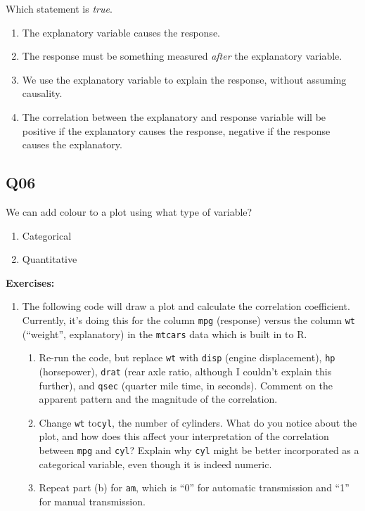 \documentclass[
  letterpaper,
  DIV=11,
  numbers=noendperiod]{scrreprt}
\providecommand{\tightlist}{%
  \setlength{\itemsep}{0pt}\setlength{\parskip}{0pt}}\usepackage{longtable,booktabs,array}
\begin{document}
Which statement is \emph{true}.

\begin{enumerate}
\def\labelenumi{\arabic{enumi}.}
\tightlist
\item
  The explanatory variable causes the response.
\item
  The response must be something measured \emph{after} the explanatory
  variable.
\item
  We use the explanatory variable to explain the response, without
  assuming causality.
\item
  The correlation between the explanatory and response variable will be
  positive if the explanatory causes the response, negative if the
  response causes the explanatory.
\end{enumerate}

\hypertarget{q06}{%
\subsection{Q06}\label{q06}}

We can add colour to a plot using what type of variable?

\begin{enumerate}
\def\labelenumi{\arabic{enumi}.}
\tightlist
\item
  Categorical
\item
  Quantitative
\end{enumerate}

\textbf{Exercises:}

\begin{enumerate}
\def\labelenumi{\arabic{enumi}.}
\tightlist
\item
  The following code will draw a plot and calculate the correlation
  coefficient. Currently, it's doing this for the column \texttt{mpg}
  (response) versus the column \texttt{wt} (``weight'', explanatory) in
  the \texttt{mtcars} data which is built in to R.

  \begin{enumerate}
  \def\labelenumii{\alph{enumii}.}
  \tightlist
  \item
    Re-run the code, but replace \texttt{wt} with \texttt{disp} (engine
    displacement), \texttt{hp} (horsepower), \texttt{drat} (rear axle
    ratio, although I couldn't explain this further), and \texttt{qsec}
    (quarter mile time, in seconds). Comment on the apparent pattern and
    the magnitude of the correlation.
  \item
    Change \texttt{wt} to\texttt{cyl}, the number of cylinders. What do
    you notice about the plot, and how does this affect your
    interpretation of the correlation between \texttt{mpg} and
    \texttt{cyl}? Explain why \texttt{cyl} might be better incorporated
    as a categorical variable, even though it is indeed numeric.
  \item
    Repeat part (b) for \texttt{am}, which is ``0'' for automatic
    transmission and ``1'' for manual transmission.
  \end{enumerate}
\end{enumerate}
\end{document}

